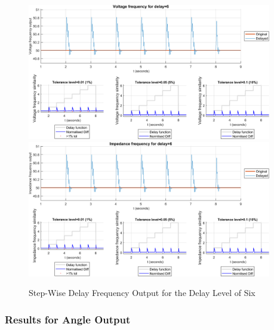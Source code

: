 \begin{figure}
    \caption{Step-Wise Delay Frequency Output for the Delay Level of Six}
    \includegraphics[width=0.95\textwidth]{PMUsim-figures/DelayOf_6/Step_vFrequency.png}    
    \label{fig:PMUsimStep_Six_vFrequency}
    \includegraphics[width=0.95\textwidth]{PMUsim-figures/DelayOf_6/Step_iFrequency.png}    
    \label{fig:PMUsimStep_Six_Frequency}
        \begin{small}
     \end{small}

\end{figure}


\newpage \subsubsection{Results for Angle Output}


